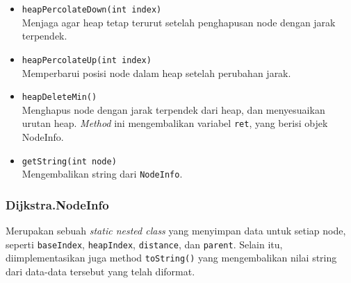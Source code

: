 \begin{itemize}
\begin{itemize}
        \item \texttt{heapPercolateDown(int index)}
        \\ Menjaga agar heap tetap terurut setelah penghapusan node dengan jarak terpendek.
        \item \texttt{heapPercolateUp(int index)}
        \\ Memperbarui posisi node dalam heap setelah perubahan jarak.
        \item \texttt{heapDeleteMin()}
        \\ Menghapus node dengan jarak terpendek dari heap, dan menyesuaikan urutan heap. \textit{Method} ini mengembalikan variabel \texttt{ret}, yang berisi objek NodeInfo.
        \item \texttt{getString(int node)}
        \\ Mengembalikan string dari \texttt{NodeInfo}.
    \end{itemize}
\end{itemize}

\subsubsection{Dijkstra.NodeInfo}
Merupakan sebuah \textit{static nested class} yang menyimpan data untuk setiap node, seperti \texttt{baseIndex}, \texttt{heapIndex}, \texttt{distance}, dan \texttt{parent}. Selain itu, diimplementasikan juga method \texttt{toString()} yang mengembalikan nilai string dari data-data tersebut yang telah diformat.

